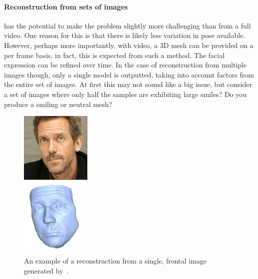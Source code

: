 \paragraph{Reconstruction from sets of images} has the potential to
make the problem slightly more challenging than from a full video. One
reason for this is that there is likely less variation in pose
available. However, perhaps more importantly, with video, a 3D mesh
can be provided on a per frame basis, in fact, this is expected from
such a method. The facial expression can be refined over time. In the
case of reconstruction from multiple images though, only a single
model is outputted, taking into account factors from the entire set of
images. At first this may not sound like a big issue, but consider a
set of images where only half the samples are exhibiting large smiles?
Do you produce a smiling or neutral mesh?

\begin{figure}
  \includegraphics[width=0.3\textwidth,right]{img/unrestricted.png}
  \caption[Example output from Unrestricted Facial Geometry
  Reconstruction method]{An example of a reconstruction from a single,
    frontal image generated by~\cite{sela2017unrestricted}.}
  \label{fig:unrestricted}
\end{figure}

